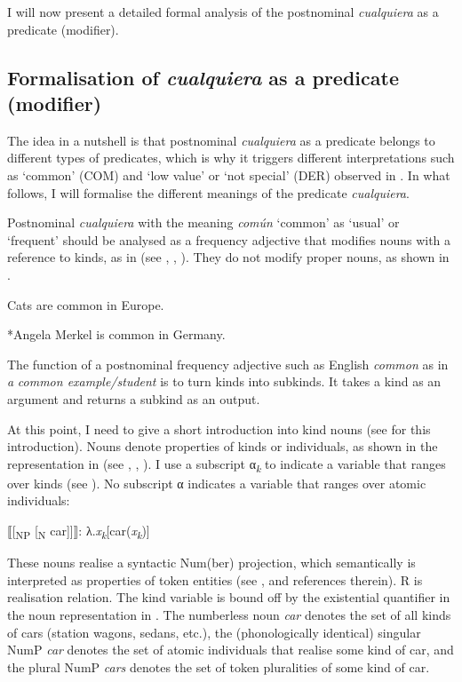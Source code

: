 {I will now present a detailed formal analysis of the postnominal \textit{cualquiera} as a predicate (modifier).

\subsection{{Formalisation} {of} {\textit{cualquiera}} {as} {a} {predicate} {(modifier)} } \label{sec:3.3.1}

The idea in a nutshell is that postnominal \textit{cualquiera} as a predicate belongs to different types of predicates, which is why it triggers different interpretations such as ‘common’ (COM) and ‘low value’ or ‘not special’ (DER) observed in . In what follows, I will formalise the different meanings of the predicate \textit{cualquiera}.

Postnominal \textit{cualquiera} with the meaning \textit{común} ‘common’ as ‘usual’ or ‘frequent’ should be analysed as a frequency adjective that modifies nouns with a reference to kinds, as in  (see \citealt{Carlson1977}, \citealt{Chierchia1998}, \citealt{GehrkeMcNally2015}). They do not modify proper nouns, as shown in .

\ea \label{bkm:Ref72354905} %
Cats are common in Europe.
\z 

\ea \label{bkm:Ref72354921} %
*Angela Merkel is common in Germany.
\z

The function of a postnominal frequency adjective such as English \textit{common} as in \textit{a} \textit{common example/student} is to turn kinds into subkinds. It takes a kind as an argument and returns a subkind as an output.

At this point, I need to give a short introduction into kind nouns (see \citealt{GehrkeMcNally2015} for this introduction). Nouns denote properties of kinds or individuals, as shown in the representation in  (see \citealt{Carlson1977}, \citealt{Chierchia1998}, \citealt{GehrkeMcNally2015}). I use a subscript α\textit{\textsubscript{k}} to indicate a variable that ranges over kinds (see \citealt{GehrkeMcNally2015}). No subscript α indicates a variable that ranges over atomic individuals:

\ea \label{bkm:Ref42889594} %
⟦[\textsubscript{NP} [\textsubscript{N} car]]⟧: λ.\textit{x\textsubscript{k}}[car(\textit{x\textsubscript{k}})]
\z

These nouns realise a syntactic Num(ber) projection, which semantically is interpreted as properties of token entities (see \citealt{GehrkeMcNally2015}, and references therein). R is  realisation relation. The kind variable is bound off by the existential quantifier in the noun representation in . The numberless noun \textit{car} denotes the set of all kinds of cars (station wagons, sedans, etc.), the (phonologically identical) singular NumP \textit{car} denotes the set of atomic individuals that realise some kind of car, and the plural NumP \textit{cars} denotes the set of token pluralities of some kind of car.

}
